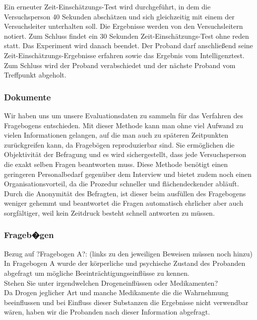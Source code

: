 \documentclass{Bericht}
\begin{document}
Ein erneuter Zeit-Einschätzungs-Test wird durchgeführt, in dem die Versuchsperson 40 Sekunden abschätzen und sich gleichzeitig mit einem der Versuchsleiter unterhalten soll. Die Ergebnisse werden von den Versuchsleitern notiert. Zum Schluss findet ein 30 Sekunden Zeit-Einschätzungs-Test ohne reden statt. Das Experiment wird danach beendet. Der Proband darf anschließend seine Zeit-Einschätzungs-Ergebnisse erfahren sowie das Ergebnis vom Intelligenztest. Zum Schluss wird der Proband verabschiedet und der nächste Proband vom Treffpunkt abgeholt.

\subsubsection{Dokumente}

Wir haben uns um unsere Evaluationsdaten zu sammeln für das Verfahren des Fragebogens entschieden. Mit dieser Methode kann man ohne viel Aufwand zu vielen Informationen gelangen, auf die man auch zu späteren Zeitpunkten zurückgreifen kann, da Fragebögen reproduzierbar sind. Sie ermöglichen die Objektivität der Befragung und es wird sichergestellt, dass jede Versuchsperson die exakt selben Fragen beantworten muss. Diese Methode benötigt einen geringeren Personalbedarf gegenüber dem Interview und bietet zudem noch einen Organisationsvorteil, da die Prozedur schneller und flächendeckender abläuft. Durch die Anonymität des Befragten, ist dieser beim ausfüllen des Fragebogens weniger gehemmt und beantwortet die Fragen automatisch ehrlicher aber auch sorgfältiger, weil kein Zeitdruck besteht schnell antworten zu müssen.

\par

\subsubsection{Frageb�gen}
Bezug auf ?Fragebogen A?: (links zu den jeweiligen Beweisen müssen noch hinzu) \\

In Fragebogen A wurde der körperliche und psychische Zustand des Probanden abgefragt um mögliche Beeinträchtigungseinflüsse zu kennen. \\

Stehen Sie unter irgendwelchen Drogeneinflüssen oder Medikamenten? \\

Da Drogen jeglicher Art und manche Medikamente die die Wahrnehmung beeinflussen und bei Einfluss dieser Substanzen die Ergebnisse nicht verwendbar wären, haben wir die Probanden nach dieser Information abgefragt. \\
\end{document}
